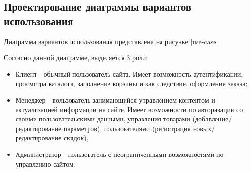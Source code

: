 \subsection{Проектирование диаграммы вариантов использования}\label{subsec:design-use-case}\indent

Диаграмма вариантов использования представлена на рисунке \ref{use-case}


Согласно данной диаграмме, выделяется 3 роли:
\begin{itemize}
    \item Клиент - обычный пользователь сайта. 
    Имеет возможность аутентификации, просмотра каталога, заполнение корзины и как следствие, оформление заказа;
    \item Менеджер - пользователь занимающийся управлением контентом и актуализацией информации на сайте. 
    Имеет возможности по авторизации со своими пользовательскими данными, управления товарами (добавление/редактирование параметров), пользователями (регистрация новых/редактирование скидок);
    \item Администратор - пользователь с неограниченными возможностями по управлению сайтом.
\end{itemize}
